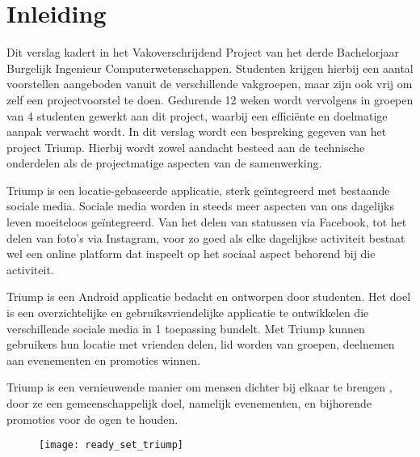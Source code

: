 \chapter{Inleiding}
Dit verslag kadert in het Vakoverschrijdend Project van het derde Bachelorjaar Burgelijk Ingenieur Computerwetenschappen. Studenten krijgen hierbij een aantal voorstellen aangeboden vanuit de verschillende vakgroepen, maar zijn ook vrij om zelf een projectvoorstel te doen. Gedurende 12 weken wordt vervolgens in groepen van 4 studenten gewerkt aan dit project, waarbij een efficiënte en doelmatige aanpak verwacht wordt. In dit verslag wordt een bespreking gegeven van het project Triump. Hierbij wordt zowel aandacht besteed aan de technische onderdelen als de projectmatige aspecten van de samenwerking.


Triump is een locatie-gebaseerde applicatie, sterk geïntegreerd met bestaande sociale media.
Sociale media worden in steeds meer aspecten van ons dagelijks leven moeiteloos geïntegreerd. Van het delen van statussen via Facebook, tot het delen van foto’s via Instagram, voor zo goed als elke dagelijkse activiteit bestaat wel een online platform dat inspeelt op het sociaal aspect behorend bij die activiteit.

Triump is een Android applicatie bedacht en ontworpen door studenten. Het doel is een overzichtelijke en gebruiksvriendelijke applicatie te ontwikkelen die verschillende sociale media in 1 toepassing bundelt. Met Triump kunnen gebruikers hun locatie met vrienden delen, lid worden van groepen, deelnemen aan evenementen en promoties winnen.

Triump is een vernieuwende manier om mensen dichter bij elkaar te brengen%
, door ze een gemeenschappelijk doel, namelijk evenementen, en bijhorende promoties voor de ogen te houden.

\begin{figure}[H]
	\centering
	\texttt{[image: ready\_set\_triump]}
	\label{fig:inleiding}
	
\end{figure}
